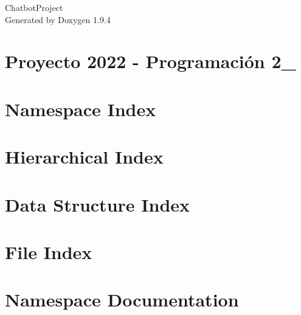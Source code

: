 \documentclass[twoside]{book}
\newcommand{\+}{\discretionary{\mbox{\scriptsize$\hookleftarrow$}}{}{}}
\newcommand{\clearemptydoublepage}{%
    \newpage{\pagestyle{empty}\cleardoublepage}%
  }
\begin{document}
  \raggedbottom
    \hypersetup{pageanchor=false,
                bookmarksnumbered=true,
                pdfencoding=unicode
               }
  \begin{titlepage}
  \vspace*{7cm}
  \begin{center}%
  {\Large Chatbot\+Project}\\
  \vspace*{1cm}
  {\large Generated by Doxygen 1.9.4}\\
  \end{center}
  \end{titlepage}
  \clearemptydoublepage
  \tableofcontents
  \clearemptydoublepage
  \hypersetup{pageanchor=true}
\chapter{Proyecto 2022 -\/ Programación 2\+\_\+}
\label{md__c___users_admin__desktop__chatbot__proyect__r_e_a_d_m_e}

\chapter{Namespace Index}

\chapter{Hierarchical Index}

\chapter{Data Structure Index}

\chapter{File Index}

\chapter{Namespace Documentation}


\end{document}
